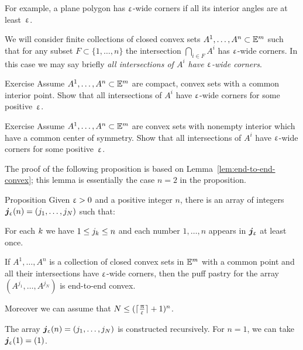 For example, 
a plane polygon 
has $\upvarepsilon$-wide corners
if all its interior angles are at least~$\upvarepsilon$.

We will consider finite collections of closed convex sets 
$A^1,\dots,A^n\subset\EE^m$ 
such that for any subset $F\subset\{1,\dots,n\}$
the intersection
$\bigcap_{i\in F}A^i$ 
has $\upvarepsilon$-wide corners.
In this case we may say briefly \emph{all intersections of $A^i$ have $\upvarepsilon$-wide corners}.


\begin{thm}{Exercise}\label{ex:compact-walls}
Assume $A^1,\dots,A^n\subset\EE^m$ are compact, convex sets with a common interior point.
Show that all intersections of $A^i$ have $\upvarepsilon$-wide corners for some positive~$\upvarepsilon$.
\end{thm}

\begin{thm}{Exercise}\label{ex:centrally-simmetric-walls}
Assume $A^1,\dots,A^n\subset\EE^m$ are
convex sets with nonempty interior which have a common center of symmetry.
Show that all intersections of $A^i$ have $\upvarepsilon$-wide corners for some positive~$\upvarepsilon$.
\end{thm}

The proof of the following proposition is based on Lemma~\ref{lem:end-to-end-convex};
this lemma is essentially the case $n=2$ in the proposition.

\begin{thm}{Proposition}\label{prop:end-to-end-convex}
Given $\upvarepsilon>0$ and a positive integer $n$, 
there is an array of integers $\bm{j}_\eps(n)=(j_1,\dots,j_N)$ 
such that: 

\begin{subthm}{} For each $k$ we have $1\le j_\kay\le n$
and each number $1,\dots,n$ appears in $\bm{j}_\upvarepsilon$ at least once.
\end{subthm}

\begin{subthm}{}
If $A^1,\dots,A^n$ is a collection of closed convex sets in $\mathbb{E}^m$ with a common point 
and all their intersections have $\upvarepsilon$-wide corners,  
then the puff pastry for the array
$(A^{j_1},\dots,A^{j_N})$ is end-to-end convex.
\end{subthm}

Moreover we can assume that $N\le (\lceil\tfrac\pi\eps\rceil+1)^n$.
\end{thm}

The array $\bm{j}_\eps(n)=(j_1,\dots,j_N)$  is constructed recursively.
For $n=1$, we can take $\bm{j}_\upvarepsilon(1)=(1)$.

